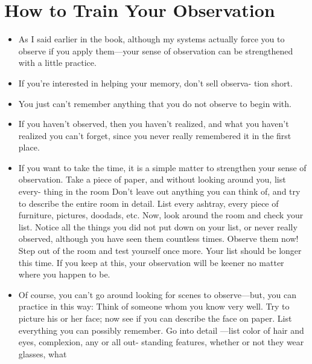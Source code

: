     \section*{How to Train Your Observation}
        \begin{itemize}
            \item As I said earlier in the book, although my systems actually
            force you to observe if you apply them—your sense of
            observation can be strengthened with a little practice.
            \item If
            you're interested in helping your memory, don't sell observa-
            tion short.
            \item You just can't remember anything that you do not observe to begin with.
            \item If you haven't observed, then you haven't realized, and
            what you haven't realized you can't forget, since you never
            really remembered it in the first place.
            \item If you want to take the time, it is a simple matter to
            strengthen your sense of observation.
                \subitem Take a
            piece of paper, and without looking around you, list every-
            thing in the room
                \subitem Don't leave out anything you can think
            of, and try to describe the entire room in detail. List every
            ashtray, every piece of furniture, pictures, doodads, etc.
                \subitem Now, look around the room and check your list.
                \subitem Notice all
            the things you did not put down on your list, or never
            really observed, although you have seen them countless
            times. Observe them now!
                \subitem Step out of the room and test
            yourself once more. Your list should be longer this time.
                \subitem If you keep at this, your observation will be keener
            no matter where you happen to be.
            \item Of course, you can't go around looking for scenes
            to observe—but, you can practice in this way:
                \subitem Think of
            someone whom you know very well. Try to picture his or
            her face; now see if you can describe the face on paper.
                \subitem List everything you can possibly remember. Go into detail
            —list color of hair and eyes, complexion, any or all out-
            standing features, whether or not they wear glasses, what

\end{itemize}
